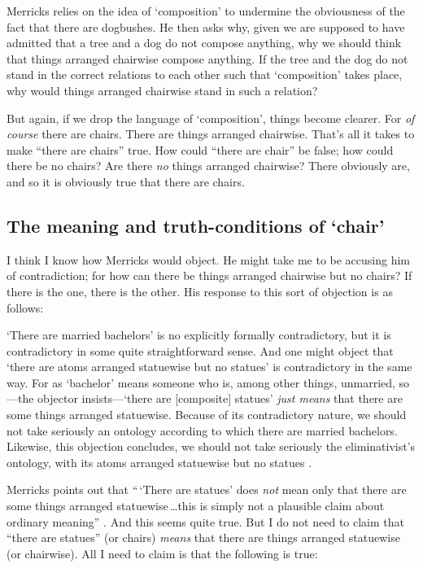 \documentclass[11pt]{article}
\newenvironment{squote}{%
\begin{spacing}{1}
       	\begin{list}{}{%
\setlength{\labelwidth}{0pt}%
\rightmargin\leftmargin%
}
\item\relax
}{%
\end{list}%
\end{spacing}
}
\begin{document}
\begin{spacing}{1.25}
Merricks relies on the idea of `composition' to undermine the
obviousness of the fact that there are dogbushes.  He then asks why,
given we are supposed to have admitted that a tree and a dog do not
compose anything, why we should think that things arranged chairwise
compose anything.  If the tree and the dog do not stand in the correct
relations to each other such that `composition' takes place, why would
things arranged chairwise stand in such a relation?

But again, if we drop the language of `composition', things become
clearer.  For {\em of course} there are chairs.  There are things
arranged chairwise.  That's all it takes to make ``there are chairs''
true.  How could ``there are chair'' be false; how could there be no
chairs?  Are there {\em no} things arranged chairwise?  There
obviously are, and so it is obviously true that there are chairs.

\subsection{The meaning and truth-conditions of `chair'}
\label{meaning}
I think I know how Merricks would object.  He might take me to be
accusing him of contradiction; for how can there be things arranged
chairwise but no chairs?  If there is the one, there is the other.
His response to this sort of objection is as follows:

\begin{squote}
`There are married bachelors' is no explicitly formally contradictory,
  but it is contradictory in some quite straightforward sense.  And
  one might object that `there are atoms arranged statuewise but no
  statues' is contradictory in the same way.  For as `bachelor' means
  someone who is, among other things, unmarried, so---the objector
  insists---`there are [composite] statues' {\em just means} that
  there are some things arranged statuewise.  Because of its
  contradictory nature, we should not take seriously an ontology
  according to which there are married bachelors.  Likewise, this
  objection concludes, we should not take seriously the
  eliminativist's ontology, with its atoms arranged statuewise but no
  statues \citeyearpar[13]{merricks2001a}.
\end{squote}

Merricks points out that ``\,`There are statues' does {\em not} mean
only that there are some things arranged statuewise\,\ldots this is
simply not a plausible claim about ordinary meaning''
\citeyearpar[13]{merricks2001a}.  And this seems quite true.  But I do
not need to claim that ``there are statues'' (or chairs) {\em means}
that there are things arranged statuewise (or chairwise).  All I need
to claim is that the following is true:


\end{spacing}
\end{document}
